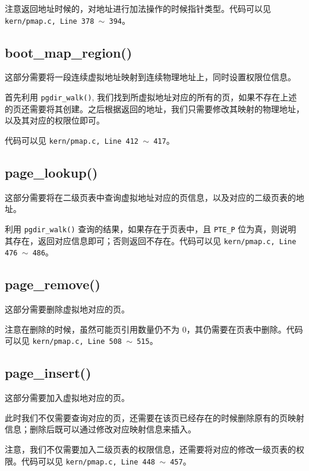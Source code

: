 \documentclass[11pt]{article}
\begin{document}
		\par 注意返回地址时候的，对地址进行加法操作的时候指针类型。代码可以见 \texttt{kern/pmap.c, Line 378 $\sim$ 394}。
		
	\subsection*{boot\_map\_region()}
		\par 这部分需要将一段连续虚拟地址映射到连续物理地址上，同时设置权限位信息。
		\par 首先利用 \texttt{pgdir\_walk()}, 我们找到所虚拟地址对应的所有的页，如果不存在上述的页还需要将其创建。之后根据返回的地址，我们只需要修改其映射的物理地址，以及其对应的权限位即可。
		\par 代码可以见 \texttt{kern/pmap.c, Line 412 $\sim$ 417}。
		
	\subsection*{page\_lookup()}
		\par 这部分需要将在二级页表中查询虚拟地址对应的页信息，以及对应的二级页表的地址。
		
		\par 利用 \texttt{pgdir\_walk()} 查询的结果，如果存在于页表中，且  \texttt{PTE\_P} 位为真，则说明其存在，返回对应信息即可；否则返回不存在。代码可以见 \texttt{kern/pmap.c, Line 476 $\sim$ 486}。
		
	
	\subsection*{page\_remove()}
		\par 这部分需要删除虚拟地对应的页。
		\par 注意在删除的时候，虽然可能页引用数量仍不为 0，其仍需要在页表中删除。代码可以见 \texttt{kern/pmap.c, Line 508 $\sim$ 515}。
	
	\subsection*{page\_insert()}
		\par 这部分需要加入虚拟地对应的页。
		\par 此时我们不仅需要查询对应的页，还需要在该页已经存在的时候删除原有的页映射信息；删除后既可以通过修改对应映射信息来插入。
		\par 注意，我们不仅需要加入二级页表的权限信息，还需要将对应的修改一级页表的权限。代码可以见 \texttt{kern/pmap.c, Line 448 $\sim$ 457}。
	
\end{document}
